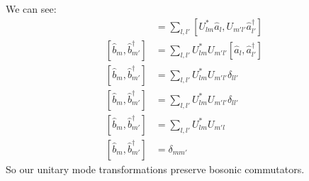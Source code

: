 We can see:
\begin{align*}
	[\hat{b}_m,\hat{b}_{m'}^\dagger] &= \sum_{l,l'} [U_{lm}^*\hat{a}_l,U_{m'l'}\hat{a}_{l'}^\dagger] \\
	[\hat{b}_m,\hat{b}_{m'}^\dagger] &= \sum_{l,l'} U_{lm}^*U_{m'l'}[\hat{a}_l,\hat{a}_{l'}^\dagger] \\
	[\hat{b}_m,\hat{b}_{m'}^\dagger] &= \sum_{l,l'} U_{lm}^*U_{m'l'}\delta_{ll'} \\
	[\hat{b}_m,\hat{b}_{m'}^\dagger] &= \sum_{l,l'} U_{lm}^*U_{m'l'}\delta_{ll'} \\
	[\hat{b}_m,\hat{b}_{m'}^\dagger] &= \sum_{l,l'} U_{lm}^*U_{m'l} \\
	[\hat{b}_m,\hat{b}_{m'}^\dagger] &= \delta_{mm'}
\end{align*}
So our unitary mode transformations preserve bosonic commutators.

